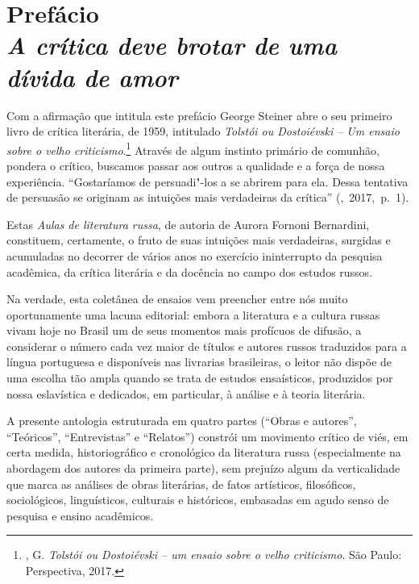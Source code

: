 \chapter*{Prefácio\\
\bigskip
\emph{A crítica deve brotar de uma dívida de amor}}




Com a afirmação que intitula este prefácio George Steiner abre o seu primeiro livro de crítica
literária, de 1959, intitulado \emph{Tolstói ou Dostoiévski -- Um ensaio
sobre o velho criticismo}.\footnote{\scalebox{0.8}{STEINER}, G. \emph{Tolstói ou
  Dostoiévski -- um ensaio sobre o velho criticismo}. São Paulo:
  Perspectiva, 2017.} Através de algum instinto primário de comunhão,
pondera o crítico, buscamos passar aos outros a qualidade e a força de
nossa experiência. ``Gostaríamos de persuadi"-los a se abrirem para ela.
Dessa tentativa de persuasão se originam as intuições mais verdadeiras
da crítica'' (\scalebox{0.8}{STEINER},~2017,~p.~1).

Estas \emph{Aulas de literatura russa}, de autoria de Aurora Fornoni
Bernardini, constituem, certamente, o fruto de suas intuições mais
verdadeiras, surgidas e acumuladas no decorrer de vários anos no
exercício ininterrupto da pesquisa acadêmica, da crítica literária e da
docência no campo dos estudos russos.

Na verdade, esta coletânea de ensaios vem preencher entre nós muito
oportunamente uma lacuna editorial: embora a literatura e a cultura
russas vivam hoje no Brasil um de seus momentos mais profícuos de
difusão, a considerar o número cada vez maior de títulos e
autores russos traduzidos para a língua portuguesa e disponíveis nas
livrarias brasileiras, o leitor não dispõe de uma escolha
tão ampla quando se trata de estudos ensaísticos,
produzidos por nossa eslavística e dedicados, em particular, à análise e
à teoria literária.

A presente antologia estruturada em quatro partes (``Obras e
autores'', ``Teóricos'', ``Entrevistas'' e ``Relatos'') constrói um movimento crítico de viés,
em certa medida, historiográfico e cronológico da literatura russa
(especialmente na abordagem dos autores da primeira parte),
sem prejuízo algum da verticalidade que marca as análises de obras literárias, de fatos artísticos, filosóficos,
sociológicos, linguísticos, culturais e históricos, embasadas em agudo
senso de pesquisa e ensino acadêmicos.

